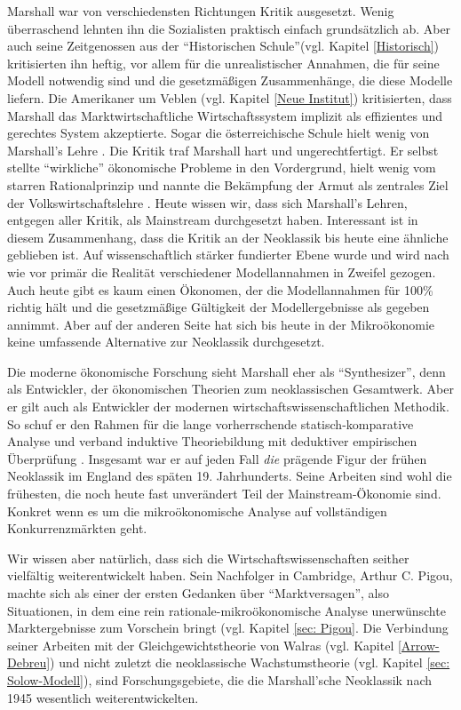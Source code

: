 Marshall war von verschiedensten Richtungen Kritik ausgesetzt. Wenig überraschend lehnten ihn die Sozialisten praktisch einfach grundsätzlich ab. Aber auch seine Zeitgenossen aus der "`Historischen Schule"'(vgl. Kapitel \ref{Historisch}) kritisierten ihn heftig, vor allem für die unrealistischer Annahmen, die für seine Modell notwendig sind und die gesetzmäßigen Zusammenhänge, die diese Modelle liefern. Die Amerikaner um Veblen (vgl. Kapitel \ref{Neue Institut}) kritisierten, dass Marshall das Marktwirtschaftliche Wirtschaftssystem implizit als effizientes und gerechtes System akzeptierte. Sogar die österreichische Schule hielt wenig von Marshall's Lehre \parencite[S. 151]{Rieter1989}. Die Kritik traf Marshall hart und ungerechtfertigt. Er selbst stellte "`wirkliche"' ökonomische Probleme in den Vordergrund, hielt wenig vom starren Rationalprinzip und nannte die Bekämpfung der Armut als zentrales Ziel der Volkswirtschaftslehre \parencite{Rieter1989}. Heute wissen wir, dass sich Marshall's Lehren, entgegen aller Kritik, als Mainstream durchgesetzt haben. Interessant ist in diesem Zusammenhang, dass die Kritik an der Neoklassik bis heute eine ähnliche geblieben  ist. Auf wissenschaftlich stärker fundierter Ebene wurde und wird nach wie vor primär die Realität verschiedener Modellannahmen in Zweifel gezogen. Auch heute gibt es kaum einen Ökonomen, der die Modellannahmen für 100\% richtig hält und die gesetzmäßige Gültigkeit der Modellergebnisse als gegeben annimmt. Aber auf der anderen Seite hat sich bis heute in der Mikroökonomie keine umfassende Alternative zur Neoklassik durchgesetzt.  

Die moderne ökonomische Forschung \parencite{Ekelund2002, Blaug2001, Humphrey1992} sieht Marshall eher als "`Synthesizer"', denn als Entwickler, \parencite[S. 212]{Ekelund2002} der ökonomischen Theorien zum neoklassischen Gesamtwerk. Aber er gilt auch als Entwickler der modernen wirtschaftswissenschaftlichen Methodik. So schuf er den Rahmen für die lange vorherrschende statisch-komparative Analyse und verband induktive Theoriebildung mit deduktiver empirischen Überprüfung \parencite[S. 212]{Ekelund2002}. Insgesamt war er auf jeden Fall \textit{die} prägende Figur der frühen Neoklassik im England des späten 19. Jahrhunderts. Seine Arbeiten sind wohl die frühesten, die noch heute fast unverändert Teil der Mainstream-Ökonomie sind. Konkret wenn es um die mikroökonomische Analyse auf vollständigen Konkurrenzmärkten geht. 

Wir wissen aber natürlich, dass sich die Wirtschaftswissenschaften seither vielfältig weiterentwickelt haben. Sein Nachfolger in Cambridge, Arthur C. Pigou, machte sich als einer der ersten Gedanken über "`Marktversagen"', also Situationen, in dem eine rein rationale-mikroökonomische Analyse unerwünschte Marktergebnisse zum Vorschein bringt (vgl. Kapitel \ref{sec: Pigou}. Die Verbindung seiner Arbeiten mit der Gleichgewichtstheorie von Walras (vgl. Kapitel \ref{Arrow-Debreu}) und nicht zuletzt die neoklassische Wachstumstheorie (vgl. Kapitel \ref{sec: Solow-Modell}), sind Forschungsgebiete, die die Marshall'sche Neoklassik nach 1945 wesentlich weiterentwickelten.


